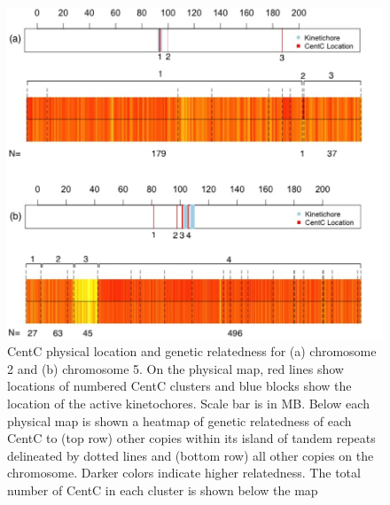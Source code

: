 \begin{figure}[h]
\centering
\includegraphics[width=1\textwidth]{Fig3_Heatmap}
\caption{CentC physical location and genetic relatedness for (a) chromosome 2 and (b) chromosome 5.  On the physical map, red lines show locations of numbered CentC clusters and blue blocks show the location of the active kinetochores.  Scale bar is in MB.  Below each physical map is shown a heatmap of genetic relatedness of each CentC to (top row) other copies within its island of tandem repeats delineated by dotted lines and (bottom row) all other copies on the chromosome.  Darker colors indicate higher relatedness.  The total number of CentC in each cluster is shown below the map
}
\label{heatmap}    
\end{figure}

